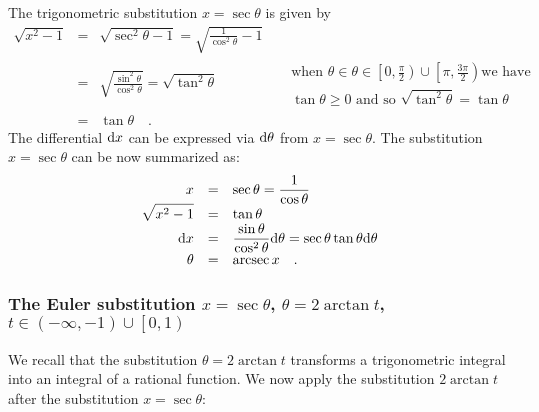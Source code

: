 \documentclass[12pt]{book}
\DeclareMathOperator{\arcsec}{arcsec}
\begin{document}
The trigonometric substitution $x=\sec \theta$ is given by
\[
\begin{array}{rcll|l}
\displaystyle \sqrt{x^2-1}&=&\displaystyle \sqrt{\sec^2\theta-1}=\sqrt{\frac{1}{\cos^2\theta}-1}\\
&=&\displaystyle \sqrt{\frac{\sin^2\theta}{\cos^2\theta}} =\sqrt{ \tan^2 \theta} &&\begin{array}{l} \text{when }\theta\in \theta \in \left[0, \frac{ \pi}{2 }\right)\cup \left[\pi, \frac{3\pi}{2}\right) \text{we have}\\
\tan \theta\geq 0 \text{ and so } \sqrt{\tan^2\theta}=\tan \theta
\end{array} \\
&=&\displaystyle \tan \theta\quad .
\end{array}
\]
The differential ${\normalfont \text{d}} x$ can be expressed via ${\normalfont \text{d}} \theta $ from $x=\sec \theta$. The substitution $x=\sec \theta $ can be now summarized as:
\begin{equation*}
\begin{array}{rcl}
\displaystyle x&=&\displaystyle \sec\theta= \frac{1}{\cos \theta}\\
\displaystyle \sqrt{x^2-1}& =&\displaystyle  \tan \theta\\
\displaystyle \diff x&=&\displaystyle \frac{\sin\theta}{ \cos^2\theta} \diff \theta= \sec\theta\tan\theta  \diff \theta\\
\displaystyle \theta&=&\arcsec x \quad .
\end{array}
\end{equation*}
\subsubsection{The Euler substitution $x=\sec \theta$, $\theta = 2\arctan t$, $ t\in (-\infty, -1) \cup \left[0, 1 \right) $}
We recall that the substitution $\theta = 2\arctan t$ transforms a trigonometric integral into an integral of a rational function. We now apply the substitution $2\arctan t$ after the substitution $x=\sec \theta$:
\end{document}
